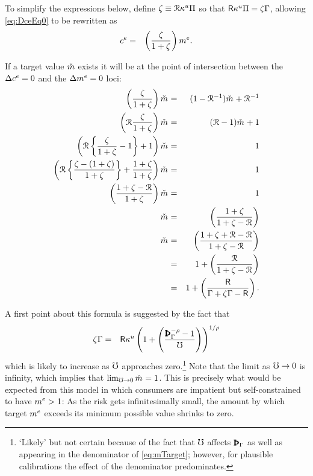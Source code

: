 \message{ !name(TractableBufferStock.tex)}\documentclass{handout}
\begin{document}
To simplify the expressions below, define $\zeta \equiv \mathcal{R} \kappa^{u} \Pi$ so
that $\mathsf{R} \kappa^{u} \Pi = \zeta \Gamma$, allowing \eqref{eq:DceEq0} 
to be rewritten as 
\begin{eqnarray}
  \cRatE_{\tSS} & = & \left(\frac{\zeta }{1+\zeta}\right)\mRatE .
\end{eqnarray}

If a target value $\check{m}$ exists it will be at the point of intersection between the $\Delta c^{e}=0$ and the $\Delta m^{e}=0$ loci:
\begin{eqnarray}
  \left(\frac{\zeta}{1+\zeta}\right)\mTarg^{\null} & = & (1-\Rnorm^{-1})\mTarg^{\null}+\Rnorm^{-1}
\\  \left(\Rnorm\frac{\zeta}{1+\zeta}\right)\mTarg^{\null} & = & (\Rnorm-1)\mTarg^{\null}+1
\\  \left(\Rnorm\left\{\frac{\zeta}{1+\zeta}-1\right\}+1\right)\mTarg^{\null} & = & 1
\\  \left(\Rnorm\left\{\frac{\zeta-(1+\zeta)}{1+\zeta}\right\}+\frac{1+\zeta}{1+\zeta}\right)\mTarg^{\null} & = & 1
\\  \left(\frac{1+\zeta-\Rnorm}{1+\zeta}\right)\mTarg^{\null} & = & 1
\\  \mTarg^{\null} & = & \left(\frac{1+\zeta}{1+\zeta-\Rnorm}\right)
\\  \mTarg^{\null} & = & \left(\frac{1+\zeta+\Rnorm-\Rnorm}{1+\zeta-\Rnorm}\right)
\\ & = & 1 + \left(\frac{\Rnorm}{1+\zeta-\Rnorm}\right)
\\ & = & 1 + \left(\frac{\Rfree}{\PGro+\zeta\PGro-\Rfree}\right)  \label{eq:mTarget}
.
\end{eqnarray}

A first point about this formula is suggested by the fact that
\begin{eqnarray}
  \zeta\PGro & = & \Rfree \MPCU \left(1+\left(\frac{\PatPGro^{-\CRRA} - 1}{\urate}\right)\right)^{1/\CRRA}
\end{eqnarray}
which is likely to increase as $\mho$ approaches zero.\footnote{`Likely' but not certain because of the fact that $\mho$ affects $\PatPGro$ as well as
  appearing in the denominator of \eqref{eq:mTarget}; however, for
  plausible calibrations the effect of the denominator predominates.}
Note that the limit as $\mho \rightarrow 0$ is infinity, which
implies that $\lim_{\urate \rightarrow
  0} \mTarg^{\null} = 1$.  This is precisely what would be expected from
this model in which consumers are impatient but self-constrained to
have $m^{e} > 1$:  As the risk gets infinitesimally small, the
amount by which target $m^{e}$ exceeds its minimum possible value shrinks to
zero.
\end{document}
